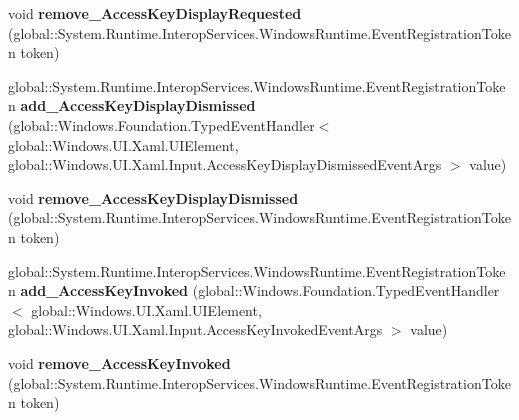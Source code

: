 \begin{DoxyCompactItemize}
\item 
\mbox{\label{interface_windows_1_1_u_i_1_1_xaml_1_1_i_u_i_element4_aea049ec23f1d2f3b558644a30bbda62d}} 
void {\bfseries remove\+\_\+\+Access\+Key\+Display\+Requested} (global\+::\+System.\+Runtime.\+Interop\+Services.\+Windows\+Runtime.\+Event\+Registration\+Token token)
\item 
\mbox{\label{interface_windows_1_1_u_i_1_1_xaml_1_1_i_u_i_element4_a9d51d9f59f40a6fabc504798338e3514}} 
global\+::\+System.\+Runtime.\+Interop\+Services.\+Windows\+Runtime.\+Event\+Registration\+Token {\bfseries add\+\_\+\+Access\+Key\+Display\+Dismissed} (global\+::\+Windows.\+Foundation.\+Typed\+Event\+Handler$<$ global\+::\+Windows.\+U\+I.\+Xaml.\+U\+I\+Element, global\+::\+Windows.\+U\+I.\+Xaml.\+Input.\+Access\+Key\+Display\+Dismissed\+Event\+Args $>$ value)
\item 
\mbox{\label{interface_windows_1_1_u_i_1_1_xaml_1_1_i_u_i_element4_a3571804f8a98025c430544d76cfc6f74}} 
void {\bfseries remove\+\_\+\+Access\+Key\+Display\+Dismissed} (global\+::\+System.\+Runtime.\+Interop\+Services.\+Windows\+Runtime.\+Event\+Registration\+Token token)
\item 
\mbox{\label{interface_windows_1_1_u_i_1_1_xaml_1_1_i_u_i_element4_abbf41cd69a2641b693ab19a02690a325}} 
global\+::\+System.\+Runtime.\+Interop\+Services.\+Windows\+Runtime.\+Event\+Registration\+Token {\bfseries add\+\_\+\+Access\+Key\+Invoked} (global\+::\+Windows.\+Foundation.\+Typed\+Event\+Handler$<$ global\+::\+Windows.\+U\+I.\+Xaml.\+U\+I\+Element, global\+::\+Windows.\+U\+I.\+Xaml.\+Input.\+Access\+Key\+Invoked\+Event\+Args $>$ value)
\item 
\mbox{\label{interface_windows_1_1_u_i_1_1_xaml_1_1_i_u_i_element4_ae34bf72d8d0d7a9d33ede980ae1b29db}} 
void {\bfseries remove\+\_\+\+Access\+Key\+Invoked} (global\+::\+System.\+Runtime.\+Interop\+Services.\+Windows\+Runtime.\+Event\+Registration\+Token token)
\item 
\mbox{\label{interface_windows_1_1_u_i_1_1_xaml_1_1_i_u_i_element4_abe904f042597f814b0e82b6911018524}} 

\end{DoxyCompactItemize}

